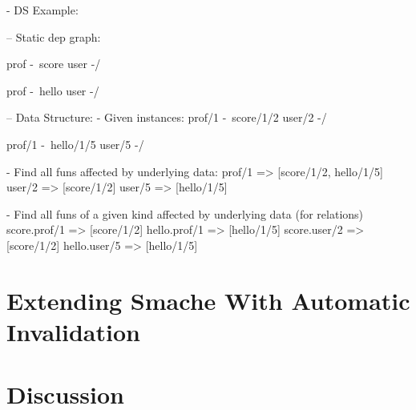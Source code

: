 - DS Example:

-- Static dep graph:

prof -\
       score
user -/

prof -\
       hello
user -/

-- Data Structure:
- Given instances:
prof/1 -\
         score/1/2
user/2 -/

prof/1 -\
         hello/1/5
user/5 -/

- Find all funs affected by underlying data:
prof/1 => [score/1/2, hello/1/5]
user/2 => [score/1/2]
user/5 => [hello/1/5]

- Find all funs of a given kind affected by underlying data (for relations)
score.prof/1 => [score/1/2]
hello.prof/1 => [hello/1/5]
score.user/2 => [score/1/2]
hello.user/5 => [hello/1/5]


\section{Extending Smache With Automatic Invalidation}
\label{sec:extending-smache-with-automatic-invalidation}




\section{Discussion}
\label{sec:discussion}









